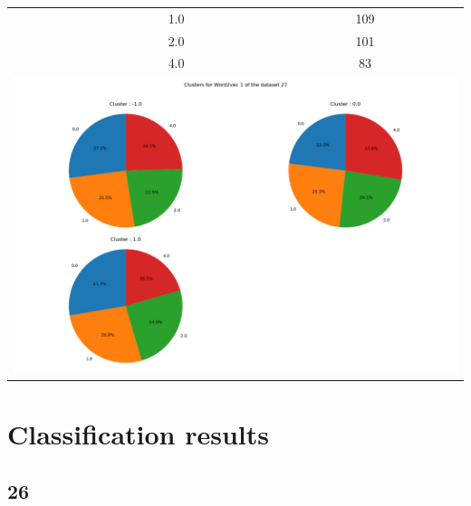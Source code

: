 \begin{longtable}{|c|c|c|c|c|}
& \multicolumn{2}{c|}{1.0} & \multicolumn{2}{c|}{109} \\
& \multicolumn{2}{c|}{2.0} & \multicolumn{2}{c|}{101} \\
& \multicolumn{2}{c|}{4.0} & \multicolumn{2}{c|}{83} \\
\hline
\multicolumn{5}{|c|}{\includegraphics[width=0.8\linewidth]{img/annexes/27/clustering_pie_charts/Word2vec 1.png}} \\
\end{longtable}


\section{Classification results}

\label{sec:annexe:classification_results}

\subsection{26}

